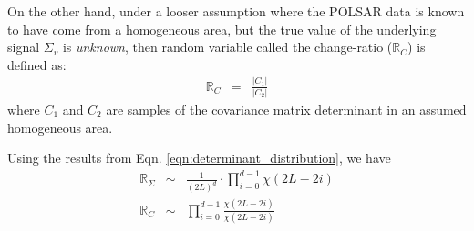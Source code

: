 \documentclass[journal]{IEEEtran}
\begin{document}
On the other hand, under a looser assumption %
  where the POLSAR data is known to have come from a homogeneous area, but the true value of the underlying signal $\Sigma_v$ is \textit{unknown},
 then random variable called the change-ratio ($\mathbb{R}_{C}$)  is defined as:
\begin{eqnarray}
  \mathbb{R}_{C} &=& \frac{|C_1|}{|C_2|} \label{eqn:determinant_ratio_samples_observables}%
\end{eqnarray}
where $C_1$ and $C_2$ are samples of the covariance matrix determinant in an assumed homogeneous area. 


Using the results from Eqn. \ref{eqn:determinant_distribution}, %
  we have
\begin{eqnarray}
\mathbb{R}_{\Sigma} &\sim& \frac{1}{(2L)^d} \cdot \prod_{i=0}^{d-1} \chi (2L-2i) \label{eqn:determinant_ratio_distribution} \\
\mathbb{R}_{C} &\sim& \prod_{i=0}^{d-1} \frac{\chi(2L-2i)}{\chi(2L-2i)}
\end{eqnarray}

\end{document}
